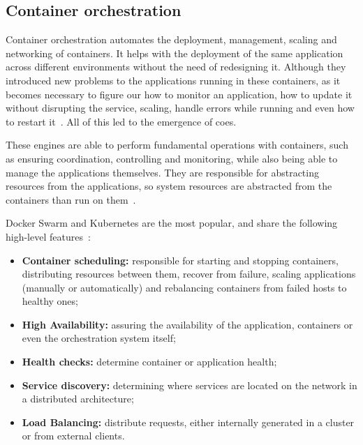 \subsection{Container orchestration}
\label{ss:container-orchestration}

Container orchestration automates the deployment, management, scaling and networking of containers. It helps with the deployment of the same application across different environments without the need of redesigning it. Although they introduced new problems to the applications running in these containers, as it becomes necessary to figure our how to monitor an application, how to update it without disrupting the service, scaling, handle errors while running and even how to restart it~\cite{kubernetes-vs-docker}. All of this led to the emergence of \acrfull{coe}s.

These engines are able to perform fundamental operations with containers, such as ensuring coordination, controlling and monitoring, while also being able to manage the applications themselves. They are responsible for abstracting resources from the applications, so system resources are abstracted from the containers than run on them~\cite{containerization-overview}.

Docker Swarm and Kubernetes are the most popular, and share the following high-level features~\cite{Casalicchio2019}:

\begin{itemize}
    \item \textbf{Container scheduling:} responsible for starting and stopping containers, distributing resources between them, recover from failure, scaling applications (manually or automatically) and rebalancing containers from failed hosts to healthy ones;
    \item \textbf{High Availability:} assuring the availability of the application, containers or even the orchestration system itself;
    \item \textbf{Health checks:} determine container or application health;
    \item \textbf{Service discovery:} determining where services are located on the network in a distributed architecture;
    \item \textbf{Load Balancing:} distribute requests, either internally generated in a cluster or from external clients. 
\end{itemize}

